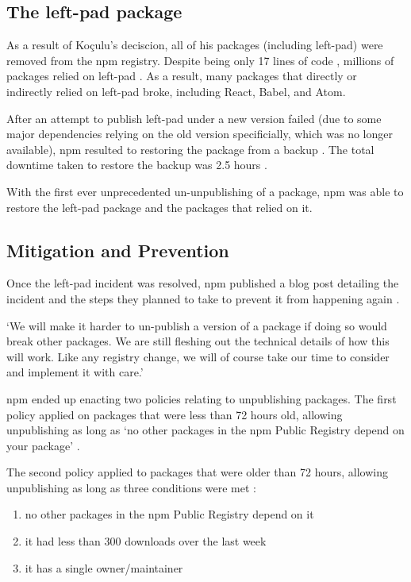\documentclass[acmsmall]{acmart}
\begin{document}
\subsection{The left-pad package}
As a result of Koçulu's deciscion, all of his packages (including left-pad) were removed
from the npm registry. Despite being only 17 lines of code \cite{github-leftpad-code},
millions of packages relied on left-pad \cite{github-leftpad-dependency}. As a result,
many packages that directly or indirectly relied on left-pad broke, including React,
Babel, and Atom.

After an attempt to publish left-pad under a new version failed (due to some major
dependencies relying on the old version specificially, which was no longer available),
npm resulted to restoring the package from a backup \cite{npmblog-leftpad}. The total
downtime taken to restore the backup was 2.5 hours \cite{npmblog-leftpad}.

With the first ever unprecedented un-unpublishing of a package, npm was able to restore
the left-pad package and the packages that relied on it.

\subsection{Mitigation and Prevention}
Once the left-pad incident was resolved, npm published a blog post detailing the
incident and the steps they planned to take to prevent it from happening again \cite{npmblog-leftpad}.

`We will make it harder to un-publish a version of a package if doing so would break other packages.
We are still fleshing out the technical details of how this will work. Like any registry change,
we will of course take our time to consider and implement it with care.' \cite{npmblog-leftpad}

npm ended up enacting two policies relating to unpublishing packages. The first policy applied on
packages that were less than 72 hours old, allowing unpublishing as long as `no other packages
in the npm Public Registry depend on your package' \cite{npm-docs-unpublishing}.

The second policy applied to packages that were older than 72 hours, allowing unpublishing as long
as three conditions were met \cite{npm-docs-unpublishing}:
\begin{enumerate}
  \item no other packages in the npm Public Registry depend on it
  \item it had less than 300 downloads over the last week
  \item it has a single owner/maintainer
\end{enumerate}
\end{document}
